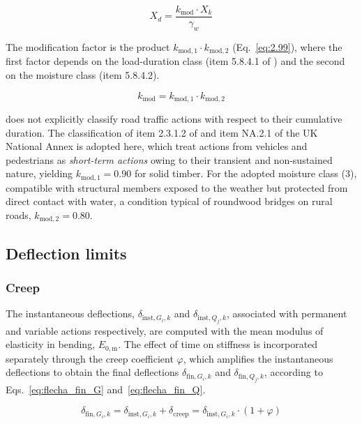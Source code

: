 \begin{equation}
    X_d = \frac{k_{\mathrm{mod}} \cdot X_k}{\gamma_w}
\label{eq:2.099}
\end{equation}

The modification factor is the product $k_{\mathrm{mod},1}\cdot k_{\mathrm{mod},2}$ (Eq.~\eqref{eq:2.99}), where the first factor depends on the load-duration class (item 5.8.4.1 of \textcite{NBR7190-1:2022}) and the second on the moisture class (item 5.8.4.2).

\begin{equation}
k_{\mathrm{mod}} = k_{\mathrm{mod},1} \cdot k_{\mathrm{mod},2}
\label{eq:2.99}
\end{equation}

\textcite{NBR7190-1:2022} does not explicitly classify road traffic actions with respect to their cumulative duration. The classification of item 2.3.1.2 of \textcite{EN1995-2:2004} and item NA.2.1 of the UK National Annex \textcite{BSNA-EN1995-2:2004} is adopted here, which treat actions from vehicles and pedestrians as \emph{short-term actions} owing to their transient and non-sustained nature, yielding $k_{\mathrm{mod},1} = 0.90$ for solid timber.
For the adopted moisture class (3), compatible with structural members exposed to the weather but protected from direct contact with water, a condition typical of roundwood bridges on rural roads, $k_{\mathrm{mod},2} = 0.80$.

\subsection{Deflection limits}\label{sec:flecha_limite}

\subsubsection{Creep}

The instantaneous deflections, $\delta_{\mathrm{inst},G_i,k}$ and $\delta_{\mathrm{inst},Q_j,k}$, associated with permanent and variable actions respectively, are computed with the mean modulus of elasticity in bending, $E_{0,\mathrm{m}}$. The effect of time on stiffness is incorporated separately through the creep coefficient $\varphi$, which amplifies the instantaneous deflections to obtain the final deflections $\delta_{\mathrm{fin},G_i,k}$ and $\delta_{\mathrm{fin},Q_j,k}$, according to Eqs.~\eqref{eq:flecha_fin_G} and~\eqref{eq:flecha_fin_Q}.

\begin{equation}
\delta_{\mathrm{fin},G_i,k}
=
\delta_{\mathrm{inst},G_i,k}
+ \delta_{\mathrm{creep}}
=
\delta_{\mathrm{inst},G_i,k} \cdot (1 + \varphi)
\label{eq:flecha_fin_G}
\end{equation}

